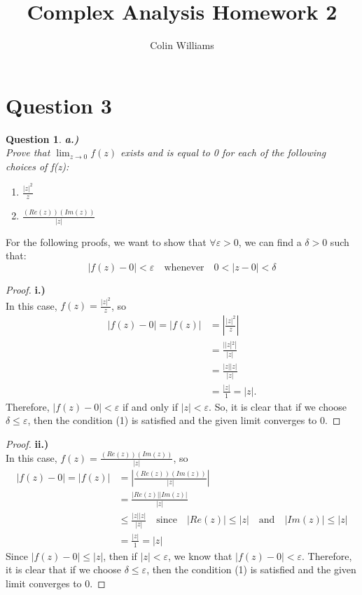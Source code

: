 \documentclass[10pt,a4paper]{article}
\title{Complex Analysis Homework 2}
\author{Colin Williams}
\newtheorem*{question*}{Question}
\begin{document}
\maketitle
\section*{Question 3}
\begin{question*}{\textbf{a.)}}
\\ Prove that $\lim_{z\to0} f(z)$ exists and is equal to 0 for each of the following choices of f(z):
\begin{enumerate}[label = \roman*.)]
\item $\frac{|z|^2}{z}$
\item $\frac{(Re(z))(Im(z))}{|z|}$
\end{enumerate}
\end{question*}

For the following proofs, we want to show that $\forall \varepsilon > 0$, we can find a $\delta > 0$ such that:
\begin{equation}
|f(z) - 0| < \varepsilon \quad \text{whenever} \quad 0 < |z - 0| < \delta
\end{equation}

\begin{proof}{\textbf{i.)}}
\\In this case, $f(z) = \frac{|z|^2}{z}$, so
\begin{align*}
|f(z) - 0| = |f(z)| &= \left|\frac{|z|^2}{z}\right|\\
&= \frac{||z|^2|}{|z|}\\
&= \frac{|z||z|}{|z|}\\
&= \frac{|z|}{1} = |z|.
\end{align*}
Therefore, $|f(z) - 0| < \varepsilon$ if and only if $|z| < \varepsilon$. So, it is clear that if we choose $\delta \leq \varepsilon$, then the condition (1) is satisfied and the given limit converges to $0$. 
\end{proof}

\begin{proof}{\textbf{ii.)}}
\\In this case, $f(z) = \frac{(Re(z))(Im(z))}{|z|}$, so
\begin{align*}
|f(z) - 0| = |f(z)| &= \left|\frac{(Re(z))(Im(z))}{|z|}\right|\\
&= \frac{|Re(z)||Im(z)|}{|z|}\\
&\leq \frac{|z||z|}{|z|} \quad \text{since} \quad |Re(z)| \leq |z| \quad \text{and} \quad |Im(z)| \leq |z|\\
&= \frac{|z|}{1} = |z|
\end{align*}
Since $|f(z) - 0| \leq |z|$, then if $|z| < \varepsilon$, we know that $|f(z) - 0| < \varepsilon$. Therefore, it is clear that if we choose $\delta \leq \varepsilon$, then the condition (1) is satisfied and the given limit converges to $0$. 
\end{proof}
\end{document}
